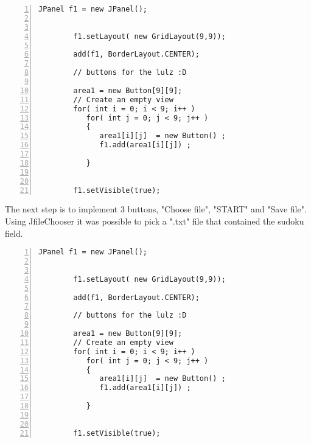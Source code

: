 \documentclass{article}
\begin{document}
\begin{lstlisting}[language=Tex, basicstyle=\footnotesize\ttfamily,
numbers=left,stepnumber=1,frame=lrtb, morekeywords={assert}, tabsize=4,
breaklines=false]
JPanel f1 = new JPanel();
	
		
        f1.setLayout( new GridLayout(9,9));
   
        add(f1, BorderLayout.CENTER);
       
        // buttons for the lulz :D
        
        area1 = new Button[9][9];
        // Create an empty view
        for( int i = 0; i < 9; i++ )
           for( int j = 0; j < 9; j++ )
           {
        	  area1[i][j]  = new Button() ;
        	  f1.add(area1[i][j]) ;
              
           }
         
        
        f1.setVisible(true);
\end{lstlisting}
\newpage
The next step is to implement 3 buttons, "Choose file", "START" and "Save file". 
Using JfileChooser it was possible to pick a ".txt" file that contained the sudoku field. 
\begin{lstlisting}[language=Tex, basicstyle=\footnotesize\ttfamily,
numbers=left,stepnumber=1,frame=lrtb, morekeywords={assert}, tabsize=4,
breaklines=false]
JPanel f1 = new JPanel();
	
		
        f1.setLayout( new GridLayout(9,9));
   
        add(f1, BorderLayout.CENTER);
       
        // buttons for the lulz :D
        
        area1 = new Button[9][9];
        // Create an empty view
        for( int i = 0; i < 9; i++ )
           for( int j = 0; j < 9; j++ )
           {
        	  area1[i][j]  = new Button() ;
        	  f1.add(area1[i][j]) ;
              
           }
         
        
        f1.setVisible(true);
\end{lstlisting}

\newpage
\end{document}
